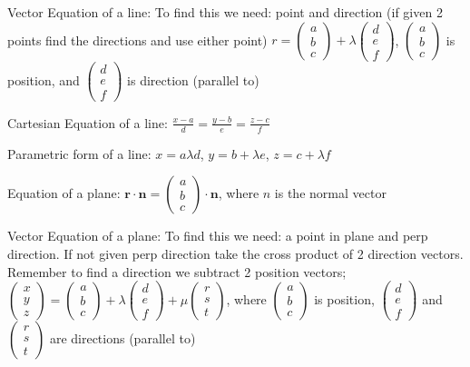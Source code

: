 \documentclass[10pt,a4paper,oneside]{book}
\begin{document}
Vector Equation of a line: To find this we need: point and direction (if given 2 points find the directions and use either point) 
$r=\begin{pmatrix}
    a\\b\\c
\end{pmatrix}+\lambda \begin{pmatrix}
    d\\e\\f
\end{pmatrix}$, $\begin{pmatrix}
    a\\b\\c
\end{pmatrix}$ is position, and $\begin{pmatrix}
    d\\e\\f
\end{pmatrix}$ is direction (parallel to)

Cartesian Equation of a line: $\frac{x-a}{d}=\frac{y-b}{e}=\frac{z-c}{f}$

Parametric form of a line: $x=a\lambda d$, $y=b+\lambda e$, $z=c+\lambda f$

Equation of a plane: $\textbf{r}\cdot\textbf{n}=\begin{pmatrix}
    a\\b\\c
\end{pmatrix}\cdot \textbf{n}$, where $n$ is the normal vector 

Vector Equation of a plane: To find this we need: a point in plane and perp direction. If not given perp direction take the cross product of 2 direction vectors. Remember to find a direction we subtract 2 position vectors;
$\begin{pmatrix}
    x\\y\\z
\end{pmatrix}=\begin{pmatrix}
    a\\b\\c
\end{pmatrix}+\lambda \begin{pmatrix}
    d\\e\\f
\end{pmatrix}+ \mu\begin{pmatrix}
    r\\s\\t
\end{pmatrix}$, where $\begin{pmatrix}
    a\\b\\c
\end{pmatrix}$ is position, $\begin{pmatrix}
    d\\e\\f
\end{pmatrix}$ and $\begin{pmatrix}
    r\\s\\t
\end{pmatrix}$ are directions (parallel to)
\end{document}
